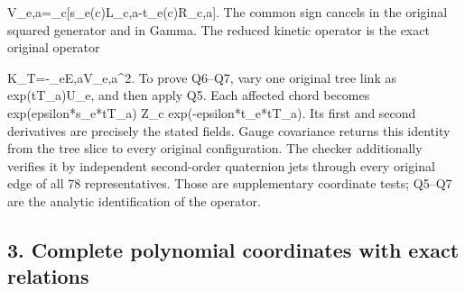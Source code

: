 \documentclass[11pt,a4paper]{article}
\renewcommand{\[}{\begingroup\small\originaldisplaystart}
\renewcommand{\]}{\originaldisplayend\endgroup}
\begin{document}
\[
 V_{e,a}=\sum_c[s_e(c)L_{c,a}-t_e(c)R_{c,a}].
\] The common sign cancels in the original squared generator and in
Gamma. The reduced kinetic operator is the exact original operator

\[
 K_T=-\sum_{e\in E,a}V_{e,a}^{2}.
\] To prove Q6--Q7, vary one original tree link as
{\ttfamily e\allowbreak{}x\allowbreak{}p\allowbreak{}(\allowbreak{}t\allowbreak{}T\allowbreak{}\_\allowbreak{}a\allowbreak{})\allowbreak{}U\allowbreak{}\_\allowbreak{}e\allowbreak{}},
and then apply Q5. Each affected chord becomes
{\ttfamily e\allowbreak{}x\allowbreak{}p\allowbreak{}(\allowbreak{}e\allowbreak{}p\allowbreak{}s\allowbreak{}i\allowbreak{}l\allowbreak{}o\allowbreak{}n\allowbreak{}*\allowbreak{}s\allowbreak{}\_\allowbreak{}e\allowbreak{}*\allowbreak{}t\allowbreak{}T\allowbreak{}\_\allowbreak{}a\allowbreak{})\allowbreak{} \allowbreak{}Z\allowbreak{}\_\allowbreak{}c\allowbreak{} \allowbreak{}e\allowbreak{}x\allowbreak{}p\allowbreak{}(\allowbreak{}-\allowbreak{}e\allowbreak{}p\allowbreak{}s\allowbreak{}i\allowbreak{}l\allowbreak{}o\allowbreak{}n\allowbreak{}*\allowbreak{}t\allowbreak{}\_\allowbreak{}e\allowbreak{}*\allowbreak{}t\allowbreak{}T\allowbreak{}\_\allowbreak{}a\allowbreak{})\allowbreak{}}.
Its first and second derivatives are precisely the stated fields. Gauge
covariance returns this identity from the tree slice to every original
configuration. The checker additionally verifies it by independent
second-order quaternion jets through every original edge of all 78
representatives. Those are supplementary coordinate tests; Q5--Q7 are
the analytic identification of the operator.

\subsection{3. Complete polynomial coordinates with exact
relations}\label{complete-polynomial-coordinates-with-exact-relations}
\end{document}
